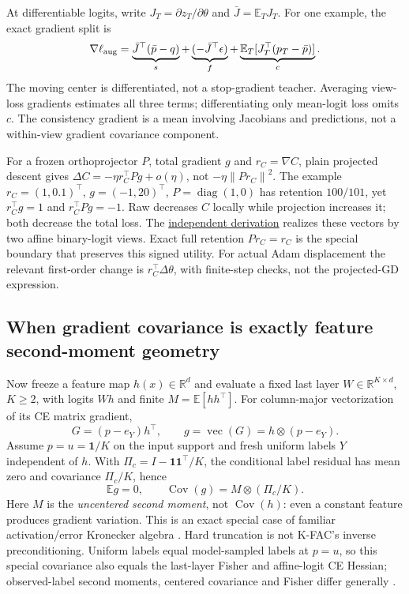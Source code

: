 \documentclass[10pt]{article}
\newcommand{\R}{\mathbb{R}}
\newcommand{\E}{\mathbb{E}}
\newcommand{\Cov}{\operatorname{Cov}}
\newcommand{\norm}[1]{\left\lVert#1\right\rVert}
\newcommand{\src}[2]{\href{../../../#1}{#2}}
\begin{document}
At differentiable logits, write $J_T=\partial z_T/\partial\theta$ and $\bar J=\E_TJ_T$. For one example, the exact gradient split is
\begin{equation}
\nabla\ell_{\rm aug}
=\underbrace{\bar J^\top(\bar p-q)}_s
+\underbrace{(-\bar J^\top\epsilon)}_f
+\underbrace{\E_T[J_T^\top(p_T-\bar p)]}_c.
\label{eq:view-gradient}
\end{equation}
The moving center is differentiated, not a stop-gradient teacher. Averaging view-loss gradients estimates all three terms; differentiating only mean-logit loss omits $c$. The consistency gradient is a mean involving Jacobians and predictions, not a within-view gradient covariance component.

For a frozen orthoprojector $P$, total gradient $g$ and $r_C=\nabla C$, plain projected descent gives $\Delta C=-\eta r_C^\top Pg+o(\eta)$, not $-\eta\norm{Pr_C}^2$. The example $r_C=(1,0.1)^\top$, $g=(-1,20)^\top$, $P=\operatorname{diag}(1,0)$ has retention $100/101$, yet $r_C^\top g=1$ and $r_C^\top Pg=-1$. Raw decreases $C$ locally while projection increases it; both decrease the total loss. The \src{output/2026-09-10-spectral-augmentation-theory/independent-math-review.md}{independent derivation} realizes these vectors by two affine binary-logit views. Exact full retention $Pr_C=r_C$ is the special boundary that preserves this signed utility. For actual Adam displacement the relevant first-order change is $r_C^\top\Delta\theta$, with finite-step checks, not the projected-GD expression.

\subsection{When gradient covariance is exactly feature second-moment geometry}
Now freeze a feature map $h(x)\in\R^d$ and evaluate a fixed last layer $W\in\R^{K\times d}$, $K\geq2$, with logits $Wh$ and finite $M=\E[hh^\top]$. For column-major vectorization of its CE matrix gradient,
\begin{equation}
G=(p-e_Y)h^\top,\qquad g=\operatorname{vec}(G)=h\otimes(p-e_Y).
\end{equation}
Assume $p=u=\mathbf1/K$ on the input support and fresh uniform labels $Y$ independent of $h$. With $\Pi_c=I-\mathbf1\mathbf1^\top/K$, the conditional label residual has mean zero and covariance $\Pi_c/K$, hence
\begin{equation}
\E g=0,\qquad \Cov(g)=M\otimes(\Pi_c/K).\label{eq:feature-covariance}
\end{equation}
Here $M$ is the \emph{uncentered second moment}, not $\Cov(h)$: even a constant feature produces gradient variation. This is an exact special case of familiar activation/error Kronecker algebra \citep[\S\S1.2--2]{martens2015kfac}. Hard truncation is not K-FAC's inverse preconditioning. Uniform labels equal model-sampled labels at $p=u$, so this special covariance also equals the last-layer Fisher and affine-logit CE Hessian; observed-label second moments, centered covariance and Fisher differ generally \citep[\S\S2, 4--5]{kunstner2019empirical}.
\end{document}
